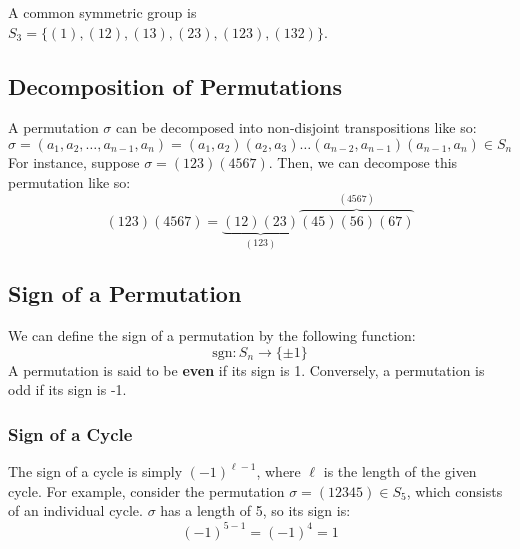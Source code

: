 \documentclass[letterpaper]{article}
\begin{document}
\bigskip 

A common symmetric group is $S_3 = \{(1), (12), (13), (23), (123), (132)\}$. 

\subsection{Decomposition of Permutations}
A permutation $\sigma$ can be decomposed into non-disjoint transpositions like so: 
\[\sigma = (a_1, a_2, \dots, a_{n - 1}, a_n) = (a_1, a_2)(a_2, a_3) \dots (a_{n - 2}, a_{n - 1})(a_{n - 1}, a_n) \in S_n\]
For instance, suppose $\sigma = (123)(4567)$. Then, we can decompose this permutation like so: 
\[(123)(4567) = \underbrace{(12)(23)}_{(123)}\overbrace{(45)(56)(67)}^{(4567)}\]

\subsection{Sign of a Permutation}
We can define the sign of a permutation by the following function: 
\[\text{sgn}: S_n \to \{\pm1\}\]
A permutation is said to be \textbf{even} if its sign is 1. Conversely, a permutation is odd if its sign is -1. 

\subsubsection{Sign of a Cycle}
The sign of a cycle is simply $(-1)^{\ell - 1}$, where $\ell$ is the length of the given cycle. For example, consider the permutation $\sigma = (12345) \in S_5$, which consists of an individual cycle. $\sigma$ has a length of 5, so its sign is:
\[(-1)^{5 - 1} = (-1)^4 = 1\] 
\end{document}
